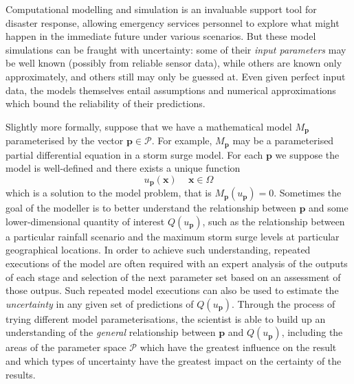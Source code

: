 \documentclass[a4paper,fontsize=12pt]{scrartcl}
\begin{document}
Computational modelling and simulation is an invaluable support tool for disaster respon\-se,
 allowing  emergency services personnel to explore 
what might happen in the immediate future 
under various scenarios. But these model simulations can be fraught with uncertainty: 
some of their {\em input parameters}  may be well
known (possibly from reliable sensor data), while others are known only approximately, and others still may
only be guessed at. Even given perfect input data, the models themselves entail assumptions and numerical approximations which bound the reliability of their predictions. 

Slightly more formally, suppose that we have a mathematical model $M_{\mathbf{p}}$
parameterised by the vector $\mathbf{p}\in\mathcal{P}$. For example, $M_{\mathbf{p}}$ may
be a parameterised partial differential equation %
in a storm
surge model. For each $\mathbf{p}$ we suppose the model is
well-defined and there exists a unique function
\begin{equation}
  \label{eq:1}
  u_{\mathbf{p}}(\mathbf{x})\, \quad \mathbf{x}\in\Omega
\end{equation}
which is a solution to the model problem, that is $M_{\mathbf{p}}(u_{\mathbf{p}})=0$.
Sometimes the goal of the modeller is to better understand the relationship
between $\mathbf{p}$ and some lower-dimensional quantity of interest
$Q(u_{\mathbf{p}})$, such as the relationship between a particular rainfall scenario and the maximum storm surge levels at particular geographical locations. In order to achieve such understanding, repeated executions of the model are often required with an expert analysis of the outputs of each stage and selection of the next parameter set based on an assessment of those outpus. Such repeated model executions can also be used to estimate the {\em uncertainty} in any given set of predictions of 
$Q(u_{\mathbf{p}})$. Through the process
of trying different model parameterisations, the scientist is able to
build up an understanding of the \emph{general} relationship between
$\mathbf{p}$ and $Q(u_{\mathbf{p}})$, including the areas of the
parameter space $\mathcal{P}$ which have the greatest influence on the
result and which
types of uncertainty have the greatest impact on the certainty of the
results.
\end{document}
